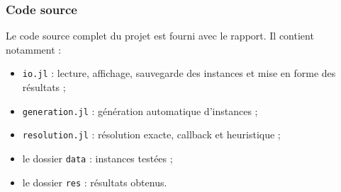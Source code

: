 \subsubsection{Code source}

Le code source complet du projet est fourni avec le rapport. Il contient notamment :
\begin{itemize}
    \item \texttt{io.jl} : lecture, affichage, sauvegarde des instances et mise en forme des résultats ;
    \item \texttt{generation.jl} : génération automatique d'instances ;
    \item \texttt{resolution.jl} : résolution exacte, callback et heuristique ;
    \item le dossier \texttt{data} : instances testées ;
    \item le dossier \texttt{res} : résultats obtenus.
\end{itemize}